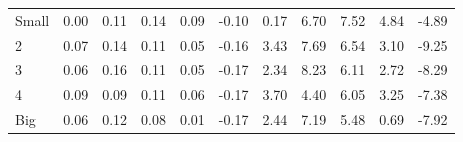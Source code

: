 \begin{table}[!ht]
\begin{tabular}{lrrrrrrrrrr}
    \\
      \cmidrule(r){2-6} \cmidrule(r){7-11}

    Small   & 0.00  & 0.11  & 0.14  & 0.09  & -0.10  & 0.17  & 6.70  & 7.52  & 4.84  & -4.89  \\
         2  & 0.07  & 0.14  & 0.11  & 0.05  & -0.16  & 3.43  & 7.69  & 6.54  & 3.10  & -9.25  \\
         3  & 0.06  & 0.16  & 0.11  & 0.05  & -0.17  & 2.34  & 8.23  & 6.11  & 2.72  & -8.29  \\
         4  & 0.09  & 0.09  & 0.11  & 0.06  & -0.17  & 3.70  & 4.40  & 6.05  & 3.25  & -7.38  \\
    Big     & 0.06  & 0.12  & 0.08  & 0.01  & -0.17  & 2.44  & 7.19  & 5.48  & 0.69  & -7.92  \\

  

  \bottomrule
\end{tabular}
\label{tbl:25_Size_Inv_C1997b}
\end{table}